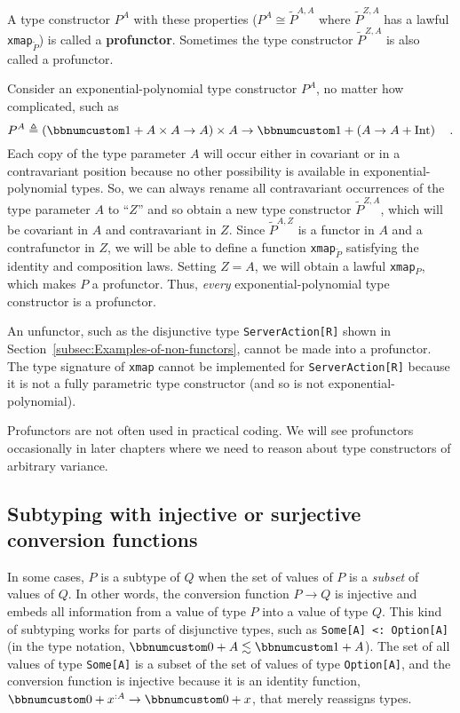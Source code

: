 A type constructor $P^{A}$ with these properties ($P^{A}\cong\tilde{P}^{A,A}$
where $\tilde{P}^{Z,A}$ has a lawful \lstinline!xmap!$_{\tilde{P}}$)
is called a \textbf{profunctor}. Sometimes
the type constructor $\tilde{P}^{Z,A}$ is also called a profunctor.

Consider an exponential-polynomial type constructor $P^{A}$, no matter
how complicated, such as
\[
P^{A}\triangleq\left(\bbnum 1+A\times A\rightarrow A\right)\times A\rightarrow\bbnum 1+\left(A\rightarrow A+\text{Int}\right)\quad.
\]
Each copy of the type parameter $A$ will occur either in covariant
or in a contravariant position because no other possibility is available
in exponential-polynomial types. So, we can always rename all contravariant
occurrences of the type parameter $A$ to \textsf{``}$Z$\textsf{''} and so obtain
a new type constructor $\tilde{P}^{Z,A}$, which will be covariant
in $A$ and contravariant in $Z$. Since $\tilde{P}^{A,Z}$ is a functor
in $A$ and a contrafunctor in $Z$, we will be able to define a function
\lstinline!xmap!$_{\tilde{P}}$ satisfying the identity and composition
laws. Setting $Z=A$, we will obtain a lawful \lstinline!xmap!$_{P}$,
which makes $P$ a profunctor. Thus, \emph{every} exponential-polynomial
type constructor is a profunctor.

An unfunctor, such as the disjunctive type \lstinline!ServerAction[R]!
shown in Section~\ref{subsec:Examples-of-non-functors}, cannot be
made into a profunctor. The type signature of \lstinline!xmap! cannot
be implemented for \lstinline!ServerAction[R]! because it is not
a fully parametric type constructor (and so is not exponential-polynomial).

Profunctors are not often used in practical coding. We will see profunctors
occasionally in later chapters where we need to reason about type
constructors of arbitrary variance.

\subsection{Subtyping with injective or surjective conversion functions}

In some cases, $P$ is a subtype of $Q$ when the set of values of
$P$ is a \emph{subset} of values of $Q$. In other words, the conversion
function $P\rightarrow Q$ is injective and embeds all information
from a value of type $P$ into a value of type $Q$. This kind of
subtyping works for parts of disjunctive types, such as \lstinline!Some[A] <: Option[A]!
(in the type notation, $\bbnum 0+A\lesssim\bbnum 1+A$). The set of
all values of type \lstinline!Some[A]! is a subset of the set of
values of type \lstinline!Option[A]!, and the conversion function
is injective because it is an identity function, $\bbnum 0+x^{:A}\rightarrow\bbnum 0+x$,
that merely reassigns types.

